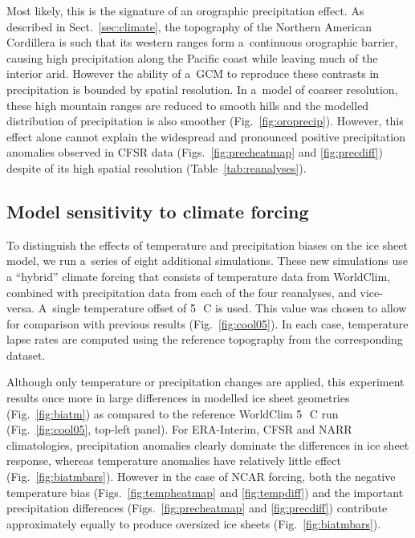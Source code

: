 \documentclass[tc, ms]{copernicus}
\begin{document}
Most likely, this is the signature of an orographic precipitation effect. As described in Sect.~\ref{sec:climate}, the topography of the Northern American Cordillera is such that its western ranges form a~continuous orographic barrier, causing high precipitation along the Pacific coast while leaving much of the interior arid. However the ability of a~GCM to reproduce these contrasts in precipitation is bounded by spatial resolution. In a~model of coarser resolution, these high mountain ranges are reduced to smooth hills and the modelled distribution of precipitation is also smoother (Fig.~\ref{fig:oroprecip}). However, this effect alone cannot explain the widespread and pronounced positive precipitation anomalies observed in CFSR data (Figs.~\ref{fig:precheatmap} and \ref{fig:precdiff}) despite of its high spatial resolution (Table~\ref{tab:reanalyses}).

\subsection{Model sensitivity to climate forcing}

To distinguish the effects of temperature and precipitation biases on the ice sheet model, we run a~series of eight additional simulations. These new simulations use a ``hybrid'' climate forcing that consists of temperature data from WorldClim, combined with precipitation data from each of the four reanalyses, and vice-versa. A~single temperature offset of 5\,\unit{{\degree}C} is used. This value was chosen to allow for comparison with previous results (Fig.~\ref{fig:cool05}). In each case, temperature lapse rates are computed using the reference topography from the corresponding dataset.

Although only temperature or precipitation changes are applied, this experiment results once more in large differences in modelled ice sheet geometries (Fig.~\ref{fig:biatm}) as compared to the reference WorldClim 5\,\unit{{\degree}C} run (Fig.~\ref{fig:cool05}, top-left panel). For ERA-Interim, CFSR and NARR climatologies, precipitation anomalies clearly dominate the differences in ice sheet response, whereas temperature anomalies have relatively little effect (Fig.~\ref{fig:biatmbars}). However in the case of NCAR forcing, both the negative temperature bias (Figs.~\ref{fig:tempheatmap} and \ref{fig:tempdiff}) and the important precipitation differences (Figs.~\ref{fig:precheatmap} and \ref{fig:precdiff}) contribute approximately equally to produce oversized ice sheets (Fig.~\ref{fig:biatmbars}).
\end{document}
